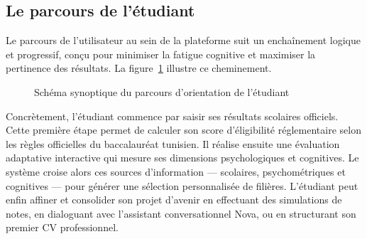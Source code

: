 \subsection{Le parcours de l'étudiant}

Le parcours de l'utilisateur au sein de la plateforme suit un enchaînement logique et progressif, conçu pour minimiser la fatigue cognitive et maximiser la pertinence des résultats. La figure~\ref{fig:parcours_orientation} illustre ce cheminement.

\begin{figure}[H]
\centering
{}
\caption{Schéma synoptique du parcours d'orientation de l'étudiant}
\label{fig:parcours_orientation}
\end{figure}

Concrètement, l'étudiant commence par saisir ses résultats scolaires officiels. Cette première étape permet de calculer son score d'éligibilité réglementaire selon les règles officielles du baccalauréat tunisien. Il réalise ensuite une évaluation adaptative interactive qui mesure ses dimensions psychologiques et cognitives. Le système croise alors ces sources d'information — scolaires, psychométriques et cognitives — pour générer une sélection personnalisée de filières. L'étudiant peut enfin affiner et consolider son projet d'avenir en effectuant des simulations de notes, en dialoguant avec l'assistant conversationnel Nova, ou en structurant son premier CV professionnel.

